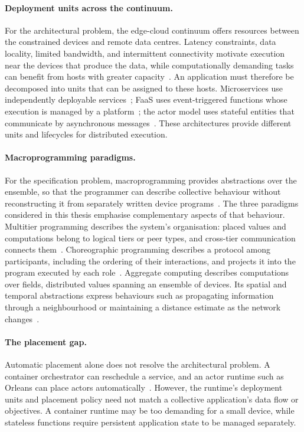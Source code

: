 \paragraph{Deployment units across the continuum.}
For the architectural problem, the edge-cloud continuum offers resources between the constrained devices and remote data centres.
Latency constraints, data locality, limited bandwidth, and intermittent connectivity motivate execution near the devices that produce the data,
while computationally demanding tasks can benefit from hosts with greater capacity~\cite{DBLP:journals/iotj/ShiCZLX16,DBLP:journals/computer/Satyanarayanan17}.
%
An application must therefore be decomposed into units that can be assigned to these hosts.
Microservices use independently deployable services~\cite{DBLP:books/sp/17/DragoniGLMMMS17};
\ac{FaaS} uses event-triggered functions whose execution is managed by a platform~\cite{DBLP:books/sp/17/BaldiniCCCFIMMRSS17};
the actor model uses stateful entities that communicate by asynchronous messages~\cite{DBLP:conf/ijcai/HewittBS73}.
%
These architectures provide different units and lifecycles for distributed execution.

\paragraph{Macroprogramming paradigms.}
For the specification problem, macroprogramming provides abstractions over the ensemble,
so that the programmer can describe collective behaviour without reconstructing it from separately written device programs~\cite{DBLP:journals/csur/Casadei23}.
%
The three paradigms considered in this thesis emphasise complementary aspects of that behaviour.
Multitier programming describes the system's organisation:
placed values and computations belong to logical tiers or peer types, and cross-tier communication connects them~\cite{DBLP:journals/csur/WeisenburgerWS20}.
%
Choreographic programming describes a protocol among participants,
including the ordering of their interactions, and projects it into the program executed by each role~\cite{Montesi2023chor}.
%
Aggregate computing describes computations over fields, distributed values spanning an ensemble of devices.
Its spatial and temporal abstractions express behaviours such as propagating information through a neighbourhood
or maintaining a distance estimate as the network changes~\cite{VIROLI2019100486}.

\paragraph{The placement gap.}
Automatic placement alone does not resolve the architectural problem.
A container orchestrator can reschedule a service, and an actor runtime such as Orleans can place actors automatically~\cite{DBLP:conf/cloud/BykovGKLPT11}.
%
However, the runtime's deployment units and placement policy need not match a collective application's data flow or objectives.
A container runtime may be too demanding for a small device,
while stateless functions require persistent application state to be managed separately.

